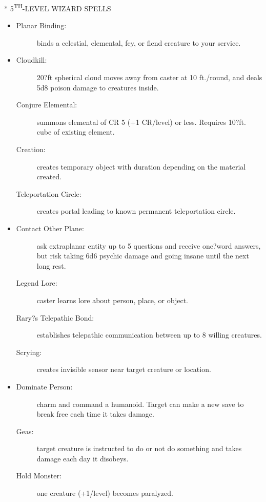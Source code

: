 \documentclass[DIV=14, paper=a4, fontsize=10pt, twocolumn, twoside]{scrartcl}
\makeatletter
\let\origsection\section
\renewcommand\section{\@ifstar{\starsection}{\nostarsection}}
\newcommand\nostarsection[1]
{\origsection{#1}\vspace{-0.5em}}
\newcommand\starsection[1]
{\vspace{-0.5cm}\origsection*{#1}\vspace{-0.3cm}}
\newcommand\invisiblesection[1]{%
  \refstepcounter{section}%
  \sectionmark{#1}
}
\newcommand\listsection[2]{%
	\invisiblesection{#2}
	\section*{\color{dndblue} #1}
}
\renewcommand\thesection{}
\makeatother
\begin{document}
\listsection{\color{dndblue}5\textsuperscript{TH}-LEVEL WIZARD SPELLS}{LEVEL 5}

\begin{itemize}[align=parleft,labelwidth=1cm]
	\renewcommand{\labelitemi}{Abjur}\item
	\begin{description}
 \item[Planar Binding:] binds a celestial, elemental, fey, or fiend creature to your service.
\end{description}
\renewcommand{\labelitemi}{Conj}\item
\begin{description}
 \item[Cloudkill:] 20?ft spherical cloud moves away from caster at 10 ft./round, and deals 5d8 poison damage to creatures inside.
 \item[Conjure Elemental:] summons elemental of CR 5 (+1 CR/level) or less. Requires 10?ft. cube of existing element.
 \item[Creation:] creates temporary object with duration depending on the material created.
 \item[Teleportation Circle:] creates portal leading to known permanent teleportation circle.
\end{description}
\renewcommand{\labelitemi}{Div}\item
\begin{description}
 \item[Contact Other Plane:] ask extraplanar entity up to 5 questions and receive one?word answers, but risk taking 6d6 psychic damage and going insane until the next long rest.
 \item[Legend Lore:] caster learns lore about person, place, or object.
 \item[Rary?s Telepathic Bond:] establishes telepathic communication between up to 8 willing creatures.
 \item[Scrying:] creates invisible sensor near target creature or location.
\end{description}
\renewcommand{\labelitemi}{Ench}\item
\begin{description}
 \item[Dominate Person:] charm and command a humanoid. Target can make a new save to break free each time it takes damage.
 \item[Geas:] target creature is instructed to do or not do something and takes damage each day it disobeys.
 \item[Hold Monster:] one creature (+1/level) becomes paralyzed.

\end{description}
\end{itemize}
\end{document}
